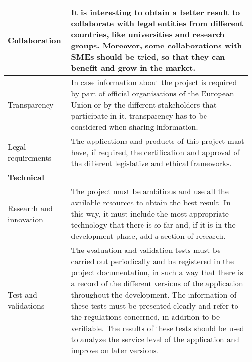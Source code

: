 \begin{longtable}[H]{lp{10.2cm}}
	\midrule
	
	Collaboration & It is interesting to obtain a better result to collaborate with legal entities from different countries, like universities and research groups. Moreover, some collaborations with SMEs should be tried, so that they can benefit and grow in the market.\vspace{0.2cm} \\
	
	\midrule
	
	Transparency & In case information about the project is required by part of official organisations of the European Union or by the different stakeholders that participate in it, transparency has to be considered when sharing information.\vspace{0.2cm} \\
	
	\midrule
	
	Legal requirements & The applications and products of this project must have, if required, the certification and approval of the different legislative and ethical frameworks.\vspace{0.2cm} \\
			
	\midrule
	
	\textbf{Technical} & \vspace{0.2cm} \\
	
	\midrule
	
	Research and innovation & The project must be ambitious and use all the available resources to obtain the best result. In this way, it must include the most appropriate technology that there is so far and, if it is in the development phase, add a section of research.\vspace{0.2cm} \\
	\midrule			
		
	Test and validations & The evaluation and validation tests must be carried out periodically and be registered in the project documentation, in such a way that there is a record of the different versions of the application throughout the development.\vspace{0.2cm}
	\newline
	The information of these tests must be presented clearly and refer to the regulations concerned, in addition to be verifiable.\vspace{0.2cm}
	\newline
	The results of these tests should be used to analyze the service level of the application and improve on later versions.\vspace{0.2cm} \\
	

\end{longtable}
